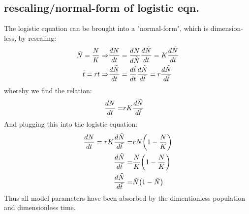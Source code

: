 \documentclass{article}
\begin{document}
\subsection{rescaling/normal-form of logistic eqn.}
The logistic equation can be brought into a "normal-form", which is dimension-less, by rescaling:
\begin{align*}
\tilde{N} = \frac{N}{K} \Rightarrow& \dv{N}{t} = \dv{N}{\tilde{N}} \dv{\tilde{N}}{t} = K \dv{\tilde{N}}{t} \\
\tilde{t} = r t \Rightarrow& \dv{\tilde{N}}{t} =  \dv{\tilde{t}}{t} \dv{\tilde{N}}{\tilde{t}} = r  \dv{\tilde{N}}{\tilde{t}}
\end{align*}
whereby we find the relation:
\begin{align*}
\dv{N}{t} =& r K \dv{\tilde{N}}{\tilde{t}} 
\end{align*}
And plugging this into the logistic equation:
\begin{align*}
\dv{N}{t} = r K \dv{\tilde{N}}{\tilde{t}} =& r N \qty(1 - \frac{N}{K}) \\
\dv{\tilde{N}}{\tilde{t}} =& \frac{N}{K} \qty(1 - \frac{N}{K}) \\
\dv{\tilde{N}}{\tilde{t}} =& \tilde{N} \qty(1 - \tilde{N})
\end{align*}
Thus all model parameters have been absorbed by the dimentionless population and dimensionless time.


\printbibliography
\end{document}
